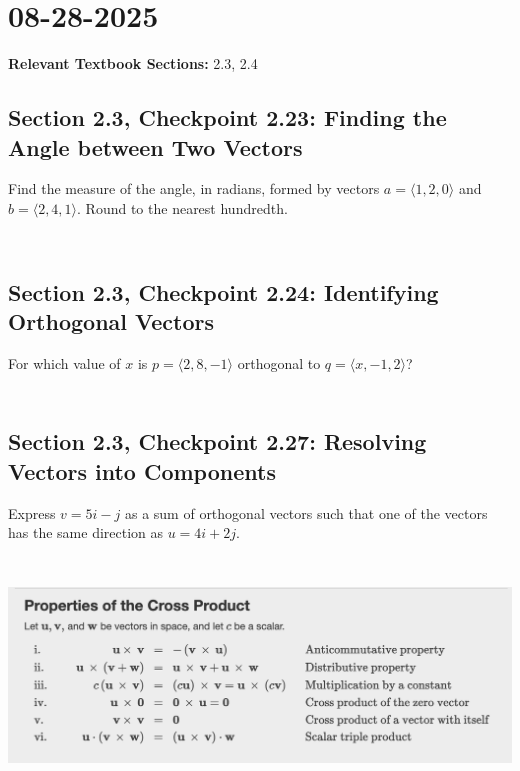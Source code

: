 \documentclass[]{mangos-musings}
\begin{document}
\newpage
\section{08-28-2025}
\textbf{Relevant Textbook Sections:} 2.3, 2.4

\subsection{Section 2.3, Checkpoint 2.23: Finding the Angle between Two Vectors}
Find the measure of the angle, in radians, formed by vectors $a=\langle1,2,0\rangle$ and $b=\langle2,4,1\rangle$. Round to the nearest hundredth.
\begin{align*}
  \\ 
  \\ 
  \\ 
  \\
\end{align*}

\subsection{Section 2.3, Checkpoint 2.24: Identifying Orthogonal Vectors}
For which value of $x$ is $p=\langle2,8,-1\rangle$ orthogonal to $q=\langle x,-1,2\rangle$?
\begin{align*}
  \\ 
  \\ 
  \\
\end{align*}

\subsection{Section 2.3, Checkpoint 2.27: Resolving Vectors into Components}
Express $v=5i-j$ as a sum of orthogonal vectors such that one of the vectors has the same direction as $u=4i+2j$.
\begin{align*}
  \\ 
  \\
  \\
  \\
\end{align*}
\begin{center}
  \includegraphics[scale=0.6]{assets/rec02-crossprod-properties.png}
\end{center}
\end{document}
